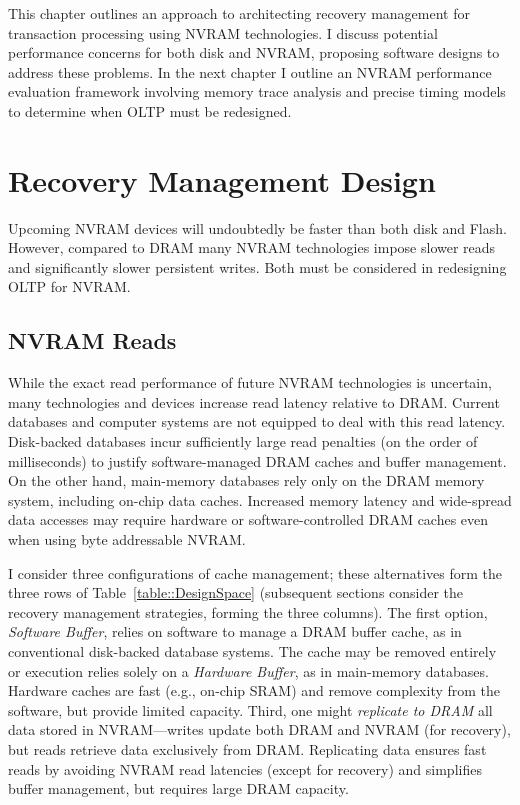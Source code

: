 This chapter outlines an approach to architecting recovery management for transaction processing using NVRAM technologies.
I discuss potential performance concerns for both disk and NVRAM, proposing software designs to address these problems.
In the next chapter I outline an NVRAM performance evaluation framework involving memory trace analysis and precise timing models to determine when OLTP must be redesigned.

\section{Recovery Management Design}
\label{sec:OLTP_design:Design}



Upcoming NVRAM devices will undoubtedly be faster than both disk and Flash.
However, compared to DRAM many NVRAM technologies impose slower reads and significantly slower persistent writes.
Both must be considered in redesigning OLTP for NVRAM.

\subsection{NVRAM Reads}
\label{sect:OLTP_design:Design:Reads}
While the exact read performance of future NVRAM technologies is uncertain, many technologies and devices increase read latency relative to DRAM.
Current databases and computer systems are not equipped to deal with this read latency.
Disk-backed databases incur sufficiently large read penalties (on the order of milliseconds) to justify software-managed DRAM caches and buffer management.
On the other hand, main-memory databases rely only on the DRAM memory system, including on-chip data caches.
Increased memory latency and wide-spread data accesses may require hardware or software-controlled DRAM caches even when using byte addressable NVRAM.

I consider three configurations of cache management; these alternatives form the three rows of Table~\ref{table::DesignSpace} (subsequent sections consider the recovery management strategies, forming the three columns).
The first option, \emph{Software Buffer}, relies on software to manage a DRAM buffer cache, as in conventional disk-backed database systems.
The cache may be removed entirely or execution relies solely on a \emph{Hardware Buffer}, as in main-memory databases.
Hardware caches are fast (e.g., on-chip SRAM) and remove complexity from the software, but provide limited capacity.
Third, one might \emph{replicate to DRAM} all data stored in NVRAM---writes update both DRAM and NVRAM (for recovery), but reads retrieve data exclusively from DRAM.
Replicating data ensures fast reads by avoiding NVRAM read latencies (except for recovery) and simplifies buf\-fer management, but requires large DRAM capacity.

